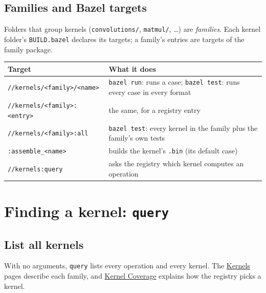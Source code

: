 \documentclass[11pt,a4paper]{article}
\newcommand{\doc}[2]{\href{https://rechefe.github.io/ipu-emulator/dev/#1/}{\textcolor{accent}{#2}}}
\begin{document}
\subsection{Families and Bazel targets}

Folders that group kernels (\texttt{convolutions/}, \texttt{matmul/},
\ldots) are \emph{families}. Each kernel folder's \texttt{BUILD.bazel} declares
its targets; a family's entries are targets of the family package.

\begin{center}
\begin{tabularx}{\linewidth}{lX}
\toprule
Target & What it does \\
\midrule
\texttt{//kernels/<family>/<name>} & \texttt{bazel run}: runs a case; \texttt{bazel test}: runs every case in every format \\
\texttt{//kernels/<family>:<entry>} & the same, for a registry entry \\
\texttt{//kernels/<family>:all} & \texttt{bazel test}: every kernel in the family plus the family's own tests \\
\texttt{:assemble\_<name>} & builds the kernel's \texttt{.bin} (its default case) \\
\texttt{//kernels:query} & asks the registry which kernel computes an operation \\
\bottomrule
\end{tabularx}
\end{center}

\section{Finding a kernel: \texttt{query}}

\subsection{List all kernels}

With no arguments, \texttt{query} lists every operation and every kernel. The
\doc{kernels}{Kernels} pages describe each family, and
\doc{explanation/kernel-coverage}{Kernel Coverage} explains how the registry picks a kernel.
\end{document}
